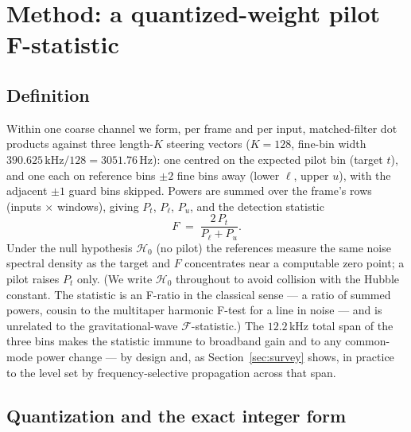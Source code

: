 \section{Method: a quantized-weight pilot F-statistic}
\label{sec:method}

\subsection{Definition}

Within one coarse channel we form, per frame and per input, matched-filter
dot products against three length-$K$ steering vectors ($K = 128$,
fine-bin width $390.625\,\mathrm{kHz}/128 = 3051.76$\,Hz): one centred on
the expected pilot bin (target $t$), and one each on reference bins $\pm 2$
fine bins away (lower $\ell$, upper $u$), with the adjacent $\pm 1$ guard
bins skipped. Powers are summed over the frame's rows (inputs $\times$
windows), giving $P_t$, $P_\ell$, $P_u$, and the detection statistic
\begin{equation}
  F \;=\; \frac{2\,P_t}{P_\ell + P_u}.
  \label{eq:fstat}
\end{equation}
Under the null hypothesis $\mathcal{H}_0$ (no pilot) the references
measure the same noise spectral density as the target and $F$ concentrates
near a computable zero point; a pilot raises $P_t$ only. (We write
$\mathcal{H}_0$ throughout to avoid collision with the Hubble constant.
The statistic is an F-ratio in the classical sense --- a ratio of summed
powers, cousin to the multitaper harmonic F-test for a line in noise
\citep{thomson1982spectrum} --- and is unrelated to the gravitational-wave
$\mathcal{F}$-statistic.) The $12.2$\,kHz total span of the three bins makes the
statistic immune to broadband gain and to any common-mode power change ---
by design and, as Section~\ref{sec:survey} shows, in practice to the level
set by frequency-selective propagation across that span.

\subsection{Quantization and the exact integer form}

